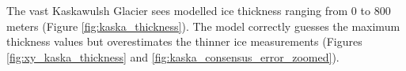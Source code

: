 \documentclass[a4, 12pt]{article}
\newcommand{\fref}[1]{(Figure \ref{#1})}
\begin{document}
The vast Kaskawulsh Glacier sees modelled ice thickness \citep{farinotti2019consensus} ranging from 0 to 800 meters \fref{fig:kaska_thickness}. The model correctly guesses the maximum thickness values but overestimates the thinner ice measurements (Figures \ref{fig:xy_kaska_thickness} and \ref{fig:kaska_consensus_error_zoomed}).

\begin{figure}[h!]
\centering
{}
\end{figure}
\end{document}
